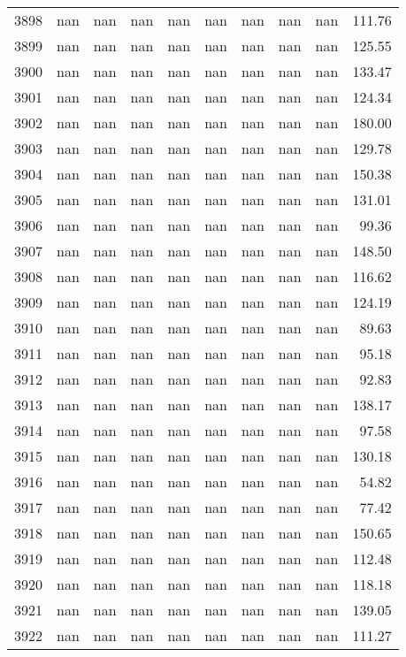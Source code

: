 \begin{tabular}{lrrrrrrrrr}
3898 & nan & nan & nan & nan & nan & nan & nan & nan & 111.76 \\
3899 & nan & nan & nan & nan & nan & nan & nan & nan & 125.55 \\
3900 & nan & nan & nan & nan & nan & nan & nan & nan & 133.47 \\
3901 & nan & nan & nan & nan & nan & nan & nan & nan & 124.34 \\
3902 & nan & nan & nan & nan & nan & nan & nan & nan & 180.00 \\
3903 & nan & nan & nan & nan & nan & nan & nan & nan & 129.78 \\
3904 & nan & nan & nan & nan & nan & nan & nan & nan & 150.38 \\
3905 & nan & nan & nan & nan & nan & nan & nan & nan & 131.01 \\
3906 & nan & nan & nan & nan & nan & nan & nan & nan & 99.36 \\
3907 & nan & nan & nan & nan & nan & nan & nan & nan & 148.50 \\
3908 & nan & nan & nan & nan & nan & nan & nan & nan & 116.62 \\
3909 & nan & nan & nan & nan & nan & nan & nan & nan & 124.19 \\
3910 & nan & nan & nan & nan & nan & nan & nan & nan & 89.63 \\
3911 & nan & nan & nan & nan & nan & nan & nan & nan & 95.18 \\
3912 & nan & nan & nan & nan & nan & nan & nan & nan & 92.83 \\
3913 & nan & nan & nan & nan & nan & nan & nan & nan & 138.17 \\
3914 & nan & nan & nan & nan & nan & nan & nan & nan & 97.58 \\
3915 & nan & nan & nan & nan & nan & nan & nan & nan & 130.18 \\
3916 & nan & nan & nan & nan & nan & nan & nan & nan & 54.82 \\
3917 & nan & nan & nan & nan & nan & nan & nan & nan & 77.42 \\
3918 & nan & nan & nan & nan & nan & nan & nan & nan & 150.65 \\
3919 & nan & nan & nan & nan & nan & nan & nan & nan & 112.48 \\
3920 & nan & nan & nan & nan & nan & nan & nan & nan & 118.18 \\
3921 & nan & nan & nan & nan & nan & nan & nan & nan & 139.05 \\
3922 & nan & nan & nan & nan & nan & nan & nan & nan & 111.27 \\

\end{tabular}
